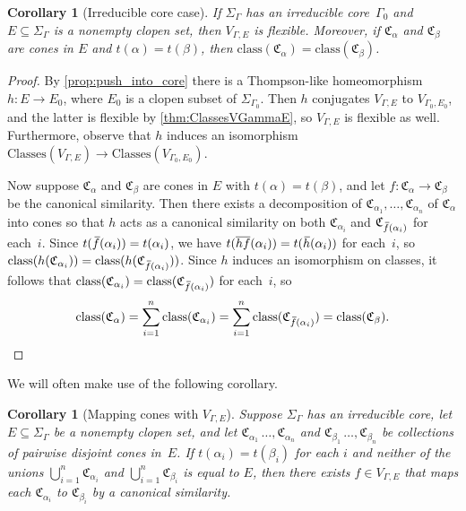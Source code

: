 \documentclass[11pt,letterpaper]{amsart}
\newtheorem{corollary}[theorem]{Corollary}
\theoremstyle{definition}
\newcommand{\C}{\mathfrak{C}}
\newcommand{\Classes}{\mathrm{Classes}}
\newcommand{\class}{\mathrm{class}}
\newcommand{\of}{\mkern 3.5mu\overline{\mkern-3.5mu f\mkern0.75mu}\mkern-0.75mu}
\newcommand{\oh}{\mkern 2mu\overline{\mkern-2mu h\mkern-0.25mu}\mkern 0.25mu}
\begin{document}
\begin{corollary}[Irreducible core case]\label{cor:IrreducibleCoreFlexible}
If\/ $\Sigma_\Gamma$ has an irreducible core\/~$\Gamma_0$ and $E\subseteq \Sigma_{\Gamma}$ is a nonempty clopen set, then $V_{\Gamma,E}$ is flexible.  Moreover, if\/ $\C_\alpha$ and\/ $\C_\beta$ are cones in $E$ and $t(\alpha)=t(\beta)$, then\/ $\class(\C_{\alpha})=\class(\C_\beta)$.
\end{corollary}
\begin{proof}
By \cref{prop:push_into_core} there is a Thompson-like homeomorphism $h\colon E\to E_0$, where $E_0$ is a clopen subset of $\Sigma_{\Gamma_0}$.  Then $h$ conjugates $V_{\Gamma,E}$ to $V_{\Gamma_0,E_0}$, and the latter is flexible by \cref{thm:ClassesVGammaE}, so $V_{\Gamma,E}$ is flexible as well.  Furthermore, observe that $h$ induces an isomorphism $\Classes(V_{\Gamma,E})\to \Classes(V_{\Gamma_0,E_0})$.

Now suppose $\C_\alpha$ and $\C_\beta$ are cones in $E$ with $t(\alpha)=t(\beta)$, and let $f\colon \C_\alpha\to \C_\beta$ be the canonical similarity.  Then there exists a decomposition of $\C_{\alpha_1},\ldots,\C_{\alpha_n}$ of $\C_{\alpha}$ into cones so that $h$ acts as a canonical similarity on both $\C_{\alpha_i}$ and $\C_{\of(\alpha_i)}$ for each~$i$.  Since $t(\of(\alpha_i)) = t(\alpha_i)$, we have $t(\overline{hf}(\alpha_i))=t(\oh(\alpha_i))$ for each~$i$, so $\class(h(\C_{\alpha_i}))=\class(h(\C_{\of(\alpha_i)}))$. Since $h$ induces an isomorphism on classes, it follows that $\class(\C_{\alpha_i})=\class(\C_{\of(\alpha_i)})$ for each~$i$, so
\[
\class(\C_{\alpha})=\sum_{i=1}^n \class(\C_{\alpha_i}) = \sum_{i=1}^n \class(\C_{\of(\alpha_i)}) = \class(\C_\beta).\qedhere
\]
\end{proof}

We will often make use of the following corollary.

\begin{corollary}[Mapping cones with $V_{\Gamma,E}$]\label{cor:MappingConesWithV}
Suppose $\Sigma_\Gamma$ has an irreducible core, let $E\subseteq \Sigma_\Gamma$ be a nonempty clopen set, and let\/ $\C_{\alpha_1}\,\ldots,\C_{\alpha_n}$ and\/ $\C_{\beta_1}\,\ldots,\C_{\beta_n}$ be collections of pairwise disjoint cones in~$E$.  If $t(\alpha_i)=t(\beta_i)$ for each $i$ and neither of the unions\/ $\bigcup_{i=1}^n \C_{\alpha_i}$ and\/ $\bigcup_{i=1}^n \C_{\beta_i}$ is equal to $E$, then there exists $f\in V_{\Gamma,E}$ that maps each\/ $\C_{\alpha_i}$ to\/ $\C_{\beta_i}$ by a canonical similarity.
\end{corollary}
\end{document}

